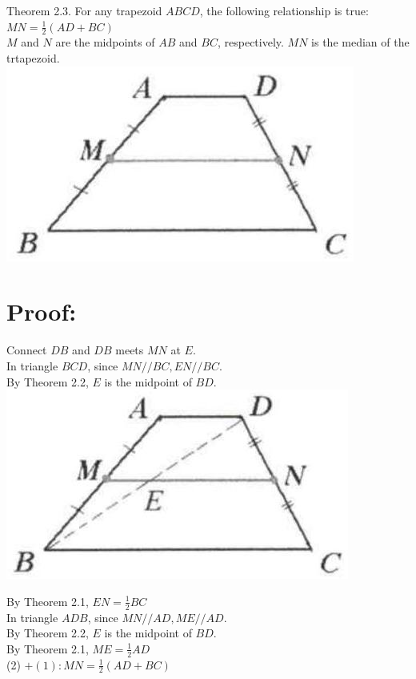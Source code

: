 \documentclass[10pt]{article}
\begin{document}
Theorem 2.3. For any trapezoid \(A B C D\), the following relationship is true:\\
\(M N=\frac{1}{2}(A D+B C)\)\\
\(M\) and \(N\) are the midpoints of \(A B\) and \(B C\), respectively. \(M N\) is the median of the trtapezoid.\\
\includegraphics[max width=\textwidth, center]{2025_04_17_97bc1f7e44d93c271a88g-034(1)}

\section*{Proof:}
Connect \(D B\) and \(D B\) meets \(M N\) at \(E\).\\
In triangle \(B C D\), since \(M N / / B C, E N / / B C\).\\
By Theorem 2.2, \(E\) is the midpoint of \(B D\).\\
\includegraphics[max width=\textwidth, center]{2025_04_17_97bc1f7e44d93c271a88g-034(2)}

By Theorem 2.1, \(E N=\frac{1}{2} B C\)\\
In triangle \(A D B\), since \(M N / / A D, M E / / A D\).\\
By Theorem 2.2, \(E\) is the midpoint of \(B D\).\\
By Theorem 2.1, \(M E=\frac{1}{2} A D\)\\
(2) \(+(1): M N=\frac{1}{2}(A D+B C)\)
\end{document}
